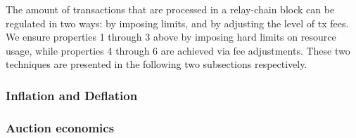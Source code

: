 The amount of transactions that are processed in a relay-chain block can be regulated in two ways: by imposing limits, and by adjusting the level of tx fees. We ensure properties 1 through 3 above by imposing hard limits on resource usage, while properties 4 through 6 are achieved via fee adjustments. These two techniques are presented in the following two subsections respectively.


\subsubsection{Inflation and Deflation}

\subsubsection{Auction economics}
